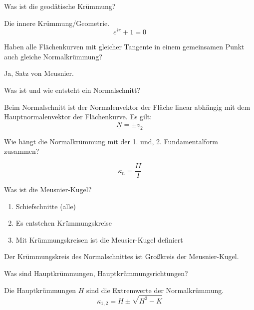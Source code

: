 \documentclass[twocolumn, fontsize=8pt, DIV=1]{scrartcl}
\begin{document}
\begin{framed}
    Was ist die geodätische Krümmung?
\end{framed}
Die innere Krümmung/Geometrie.
\[
    e^{i\pi} + 1 = 0
\]



\begin{framed}
    Haben alle Flächenkurven mit gleicher Tangente in einem gemeinsamen Punkt auch gleiche Normalkrümmung?
\end{framed}
Ja, Satz von Meusnier.



\begin{framed}
    Was ist und wie entsteht ein Normalschnitt?
\end{framed}
Beim Normalschnitt ist der Normalenvektor der Fläche linear abhängig mit dem Hauptnormalenvektor der Flächenkurve. Es gilt:
\[
    \underline{N} = \pm \underline{v}_2
\]



\begin{framed}
    Wie hängt die Normalkrümmung mit der 1. und, 2. Fundamentalform zusammen?
\end{framed}
\vspace{-1em}
\[
    \kappa_n = \frac{II}{I}
\]



\begin{framed}
    Was ist die Meusnier-Kugel?
\end{framed}
\begin{enumerate}
    \item Schiefschnitte (alle)
    \item Es entstehen Krümmungskreise
    \item Mit Krümmungskreisen ist die Meusier-Kugel definiert
\end{enumerate}
Der Krümmungskreis des Normalschnittes ist Großkreis der Meusnier-Kugel.



\begin{framed}
    Was sind Hauptkrümmungen, Hauptkrümmungsrichtungen?
\end{framed}
Die Hauptkrümmungen $H$ sind die Extremwerte der Normalkrümmung.
\[
    \kappa_{1,2} = H \pm \sqrt{H^2 - K}
\]
\end{document}
